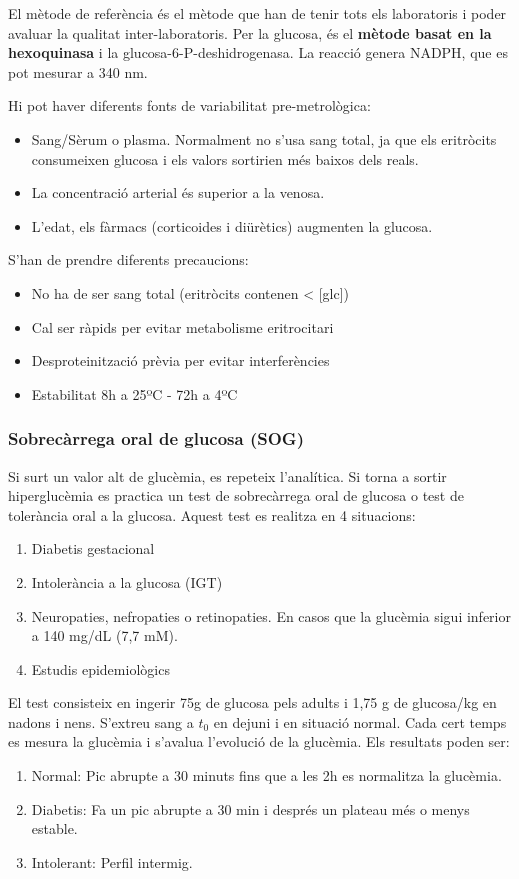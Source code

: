El mètode de referència és el mètode que han de tenir tots els
laboratoris i poder avaluar la qualitat inter-laboratoris. Per la
glucosa, és el \textbf{mètode basat en la hexoquinasa} i la
glucosa-6-P-deshidrogenasa. La reacció genera NADPH, que es pot
mesurar a 340 nm.

Hi pot haver diferents fonts de variabilitat pre-metrològica:
\begin{itemize}
\item Sang/Sèrum o plasma. Normalment no s'usa sang total, ja que els
  eritròcits consumeixen glucosa i els valors sortirien més baixos
  dels reals.
\item La concentració arterial és superior a la venosa.
\item L'edat, els fàrmacs (corticoides i diürètics) augmenten la
  glucosa.
\end{itemize}

S'han de prendre diferents precaucions:
\begin{itemize}
\item No ha de ser sang total (eritròcits contenen < [glc])
\item Cal ser ràpids per evitar metabolisme eritrocitari
\item Desproteinització prèvia per evitar interferències
\item Estabilitat 8h a 25ºC - 72h a 4ºC
\end{itemize}

\subsubsection{Sobrecàrrega oral de glucosa (SOG)}
\label{sec:sobrecarrega-oral-de}
Si surt un valor alt de glucèmia, es repeteix l'analítica. Si torna a
sortir hiperglucèmia es practica un test de sobrecàrrega oral de
glucosa o test de tolerància oral a la glucosa. Aquest test es
realitza en 4 situacions:
\begin{enumerate}
\item Diabetis gestacional
\item Intolerància a la glucosa (IGT)
\item Neuropaties, nefropaties o retinopaties. En casos que la
  glucèmia sigui inferior a 140 mg/dL (7,7 mM).
\item Estudis epidemiològics
\end{enumerate}

El test consisteix en ingerir 75g de glucosa pels adults i 1,75 g de
glucosa/kg en nadons i nens. S'extreu sang a $t_0$ en dejuni i en
situació normal. Cada cert temps es mesura la glucèmia i s'avalua
l'evolució de la glucèmia. Els resultats poden ser:
\begin{enumerate}
\item Normal: Pic abrupte a 30 minuts fins que a les 2h es normalitza
  la glucèmia.
\item Diabetis: Fa un pic abrupte a 30 min i després un  plateau més o
  menys estable.
\item Intolerant: Perfil intermig.
\end{enumerate}

